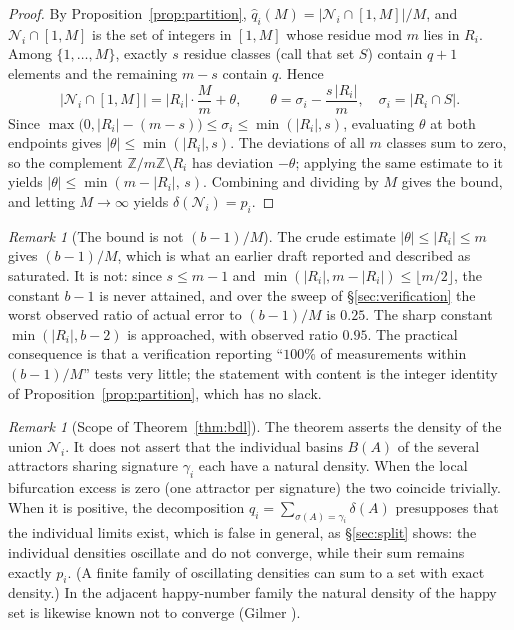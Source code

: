 \documentclass[11pt]{article}
\theoremstyle{definition}
\theoremstyle{remark}
\newtheorem{remark}[theorem]{Remark}
\begin{document}
\begin{proof}
By Proposition~\ref{prop:partition}, $\hat q_i(M) = |\mathcal{N}_i \cap [1,M]|/M$, and $\mathcal{N}_i \cap [1,M]$ is the set of integers in $[1,M]$ whose residue mod $m$ lies in $R_i$. Among $\{1,\dots,M\}$, exactly $s$ residue classes (call that set $S$) contain $q+1$ elements and the remaining $m-s$ contain $q$. Hence
\[
\big| \mathcal{N}_i \cap [1,M] \big| = |R_i| \cdot \frac{M}{m} + \theta, \qquad \theta = \sigma_i - \frac{s\,|R_i|}{m}, \quad \sigma_i = |R_i \cap S|.
\]
Since $\max\big(0, |R_i|-(m-s)\big) \le \sigma_i \le \min(|R_i|, s)$, evaluating $\theta$ at both endpoints gives $|\theta| \le \min(|R_i|, s)$. The deviations of all $m$ classes sum to zero, so the complement $\mathbb{Z}/m\mathbb{Z} \setminus R_i$ has deviation $-\theta$; applying the same estimate to it yields $|\theta| \le \min(m-|R_i|,\, s)$. Combining and dividing by $M$ gives the bound, and letting $M \to \infty$ yields $\delta(\mathcal{N}_i) = p_i$.
\end{proof}

\begin{remark}[The bound is not $(b-1)/M$]\label{rem:sharp}
The crude estimate $|\theta| \le |R_i| \le m$ gives $(b-1)/M$, which is what an earlier draft reported and described as saturated. It is not: since $s \le m-1$ and $\min(|R_i|, m-|R_i|) \le \lfloor m/2 \rfloor$, the constant $b-1$ is never attained, and over the sweep of \S\ref{sec:verification} the worst observed ratio of actual error to $(b-1)/M$ is $0.25$. The sharp constant $\min(|R_i|, b-2)$ is approached, with observed ratio $0.95$. The practical consequence is that a verification reporting ``$100\%$ of measurements within $(b-1)/M$'' tests very little; the statement with content is the integer identity of Proposition~\ref{prop:partition}, which has no slack.
\end{remark}

\begin{remark}[Scope of Theorem~\ref{thm:bdl}]\label{rem:scope}
The theorem asserts the density of the union $\mathcal{N}_i$. It does not assert that the individual basins $B(A)$ of the several attractors sharing signature $\gamma_i$ each have a natural density. When the local bifurcation excess is zero (one attractor per signature) the two coincide trivially. When it is positive, the decomposition $q_i = \sum_{\sigma(A)=\gamma_i} \delta(A)$ presupposes that the individual limits exist, which is false in general, as \S\ref{sec:split} shows: the individual densities oscillate and do not converge, while their sum remains exactly $p_i$. (A finite family of oscillating densities can sum to a set with exact density.) In the adjacent happy-number family the natural density of the happy set is likewise known not to converge (Gilmer \cite{gilmer}).
\end{remark}
\end{document}
